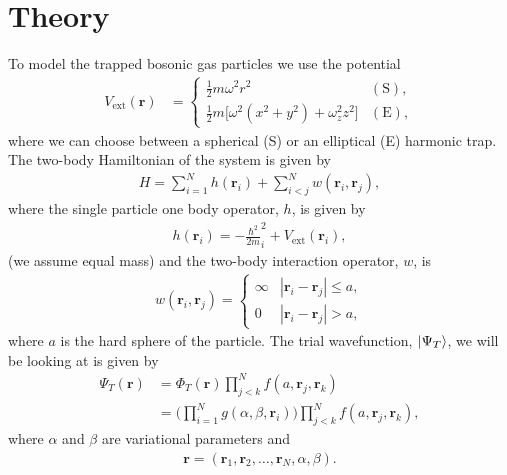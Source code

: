 \documentclass[
    a4paper, aps, twocolumn, floatfix, superscriptaddress, nofootinbib]{revtex4-1}
\newcommand{\vf}{\mathbf}
\newcommand{\1}{\mathds{1}}
\newcommand{\half}{\frac{1}{2}}
\begin{document}
\section{Theory}
    To model the trapped bosonic gas particles we use the potential
    \begin{align}
        V_{\text{ext}}(\vf{r})
        &=
        \begin{cases}
            \half m\omega^2r^2 & (\text{S}), \\
            \half m \bigl[
                \omega^2(x^2 + y^2) + \omega_z^2z^2
            \bigr] & (\text{E}),
        \end{cases}
    \end{align}
    where we can choose between a spherical (S) or an elliptical (E) harmonic
    trap. The two-body Hamiltonian of the system is given by
    \begin{align}
        H = \sum_{i = 1}^{N}h(\vf{r}_i) + \sum_{i < j}^{N}w(\vf{r}_i, \vf{r}_j),
    \end{align}
    where the single particle one body operator, $h$, is given by
    \begin{align}
        h(\vf{r}_i) = -\frac{\hbar^2}{2m}_i^2
        + V_{\text{ext}}(\vf{r}_i),
    \end{align}
    (we assume equal mass)
    and the two-body interaction operator, $w$, is
    \begin{align}
        w(\vf{r}_i, \vf{r}_j)
        = \begin{cases}
            \infty & |\vf{r}_i - \vf{r}_j| \leq a, \\
            0 & |\vf{r}_i - \vf{r}_j| > a,
        \end{cases}
    \end{align}
    where $a$ is the hard sphere of the particle. The trial wavefunction,
    $\ket{\Psi_T}$, we will
    be looking at is given by
    \begin{align}
        \Psi_T(\vf{r})
        &= \Phi_T(\vf{r})
        \prod_{j < k}^N f(a, \vf{r}_j, \vf{r}_k) \\
        &= \Biggl(
            \prod_{i = 1}^N g(\alpha, \beta, \vf{r}_i)
        \Biggr)
        \prod_{j < k}^N f(a, \vf{r}_j, \vf{r}_k),
        \label{eq:initial_trial_wavefunction}
    \end{align}
    where $\alpha$ and $\beta$ are variational parameters and
    \begin{align}
        \vf{r} = (\vf{r}_1, \vf{r}_2, \dots, \vf{r}_N, \alpha, \beta).
    \end{align}
\end{document}
